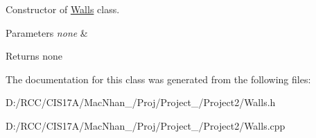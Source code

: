 Constructor of \hyperlink{class_walls}{Walls} class. 


\begin{DoxyParams}{Parameters}
{\em none} & \\
\hline
\end{DoxyParams}
\begin{DoxyReturn}{Returns}
none 
\end{DoxyReturn}


The documentation for this class was generated from the following files\+:\begin{DoxyCompactItemize}
\item 
D\+:/\+R\+C\+C/\+C\+I\+S17\+A/\+Mac\+Nhan\+\_/\+Proj/\+Project\+\_/\+Project2/Walls.\+h\item 
D\+:/\+R\+C\+C/\+C\+I\+S17\+A/\+Mac\+Nhan\+\_/\+Proj/\+Project\+\_/\+Project2/Walls.\+cpp\end{DoxyCompactItemize}
